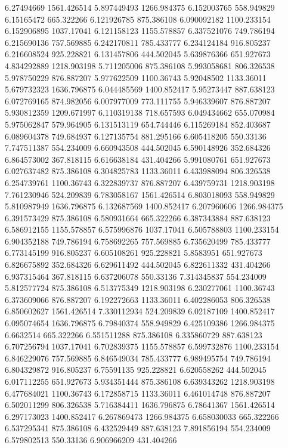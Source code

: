 6.27494669	1561.426514
5.897449493	1266.984375
6.152003765	558.949829
6.15165472	665.322266
6.121926785	875.386108
6.090092182	1100.233154
6.152906895	1037.17041
6.121158123	1155.578857
6.337521076	749.786194
6.215690136	757.569885
6.242170811	785.433777
6.234124184	916.805237
6.216608524	925.228821
6.131457806	444.502045
5.639876366	651.927673
4.834292889	1218.903198
5.711205006	875.386108
5.993058681	806.326538
5.978750229	876.887207
5.977622509	1100.36743
5.92048502	1133.36011
5.679732323	1636.796875
6.044485569	1400.852417
5.95273447	887.638123
6.072769165	874.982056
6.007977009	773.111755
5.946339607	876.887207
5.930812359	1209.671997
6.110319138	718.657593
6.049434662	655.070984
5.975062847	579.964905
6.131513119	654.744446
6.115269184	852.403687
6.089604378	749.684937
6.127135754	881.295166
6.605418205	550.33136
7.747511387	554.234009
6.660943508	444.502045
6.590148926	352.684326
6.864573002	367.818115
6.616638184	431.404266
5.991080761	651.927673
6.027637482	875.386108
6.304825783	1133.36011
6.433988094	806.326538
6.254739761	1100.36743
6.322839737	876.887207
6.439759731	1218.903198
7.761230946	524.209839
6.783058167	1561.426514
6.803018093	558.949829
5.810987949	1636.796875
6.132687569	1400.852417
6.207960606	1266.984375
6.391573429	875.386108
6.580931664	665.322266
6.387343884	887.638123
6.586912155	1155.578857
6.575996876	1037.17041
6.505788803	1100.233154
6.904352188	749.786194
6.758692265	757.569885
6.735620499	785.433777
6.773145199	916.805237
6.605108261	925.228821
5.8583951	651.927673
6.826675892	352.684326
6.629611492	444.502045
6.822611332	431.404266
6.937315464	367.818115
6.637206078	550.33136
7.314345837	554.234009
5.812577724	875.386108
6.513775349	1218.903198
6.230277061	1100.36743
6.373609066	876.887207
6.192272663	1133.36011
6.402286053	806.326538
6.850602627	1561.426514
7.330112934	524.209839
6.02187109	1400.852417
6.095074654	1636.796875
6.79840374	558.949829
6.425109386	1266.984375
6.6632514	665.322266
6.551511288	875.386108
6.335860729	887.638123
6.707256794	1037.17041
6.702839375	1155.578857
6.599732876	1100.233154
6.846229076	757.569885
6.846549034	785.433777
6.989495754	749.786194
6.804329872	916.805237
6.75591135	925.228821
6.620558262	444.502045
6.017112255	651.927673
5.934351444	875.386108
6.639343262	1218.903198
6.477684021	1100.36743
6.172858715	1133.36011
6.461014748	876.887207
6.502011299	806.326538
5.716384411	1636.796875
6.78641367	1561.426514
6.297173023	1400.852417
6.267869473	1266.984375
6.658030033	665.322266
6.537295341	875.386108
6.432529449	887.638123
7.891856194	554.234009
6.579802513	550.33136
6.906966209	431.404266
